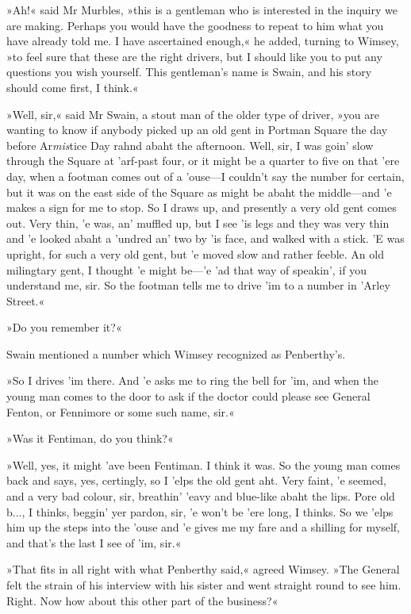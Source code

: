 »Ah!« said Mr Murbles, »this is a gentleman who is interested in the inquiry we are making. Perhaps you would have the goodness to repeat to him what you have already told me. I have ascertained enough,« he added, turning to Wimsey, »to feel sure that these are the right drivers, but I should like you to put any questions you wish yourself. This gentleman's name is Swain, and his story should come first, I think.«

»Well, sir,« said Mr Swain, a stout man of the older type of driver, »you are wanting to know if anybody picked up an old gent in Portman Square the day before Ar\textit{mis}tice Day rahnd abaht the afternoon. Well, sir, I was goin' slow through the Square at 'arf-past four, or it might be a quarter to five on that 'ere day, when a footman comes out of a 'ouse—I couldn't say the number for certain, but it was on the east side of the Square as might be abaht the middle—and 'e makes a sign for me to stop. So I draws up, and presently a very old gent comes out. Very thin, 'e was, an' muffled up, but I see 'is legs and they was very thin and 'e looked abaht a 'undred an' two by 'is face, and walked with a stick. 'E was upright, for such a very old gent, but 'e moved slow and rather feeble. An old milingtary gent, I thought 'e might be—'e 'ad that way of speakin', if you understand me, sir. So the footman tells me to drive 'im to a number in 'Arley Street.«

»Do you remember it?«

Swain mentioned a number which Wimsey recognized as Penberthy's.

»So I drives 'im there. And 'e asks me to ring the bell for 'im, and when the young man comes to the door to ask if the doctor could please see General Fenton, or Fennimore or some such name, sir.«

»Was it Fentiman, do you think?«

»Well, yes, it might 'ave been Fentiman. I think it was. So the young man comes back and says, yes, certingly, so I 'elps the old gent aht. Very faint, 'e seemed, and a very bad colour, sir, breathin' 'eavy and blue-like abaht the lips. Pore old b..., I thinks, beggin' yer pardon, sir, 'e won't be 'ere long, I thinks. So we 'elps him up the steps into the 'ouse and 'e gives me my fare and a shilling for myself, and that's the last I see of 'im, sir.«

»That fits in all right with what Penberthy said,« agreed Wimsey. »The General felt the strain of his interview with his sister and went straight round to see him. Right. Now how about this other part of the business?«

